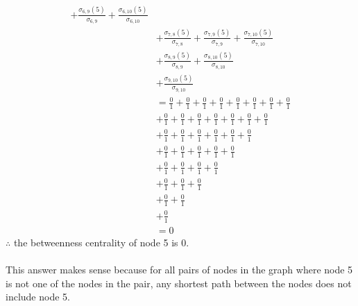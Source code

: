 \documentclass{article}
\begin{document}
\begin{enumerate}[label=(\alph*), left=10pt, itemsep=10pt]
\begin{minipage}[t]{0.9\textwidth}
\begin{align*}
                               + \frac{\sigma_{6,9}(5)}{\sigma_{6,9}}
                               + \frac{\sigma_{6,10}(5)}{\sigma_{6,10}}\\
                            &+   \frac{\sigma_{7,8}(5)}{\sigma_{7,8}}
                               + \frac{\sigma_{7,9}(5)}{\sigma_{7,9}}
                               + \frac{\sigma_{7,10}(5)}{\sigma_{7,10}}\\
                            &+   \frac{\sigma_{8,9}(5)}{\sigma_{8,9}}
                               + \frac{\sigma_{8,10}(5)}{\sigma_{8,10}}\\
                            &+   \frac{\sigma_{9,10}(5)}{\sigma_{9,10}}\\
                            &=   \frac{0}{1}
                               + \frac{0}{1}
                               + \frac{0}{1}
                               + \frac{0}{1}
                               + \frac{0}{1}
                               + \frac{0}{1}
                               + \frac{0}{1}
                               + \frac{0}{1}\\
                            &  + \frac{0}{1}
                               + \frac{0}{1}
                               + \frac{0}{1}
                               + \frac{0}{1}
                               + \frac{0}{1}
                               + \frac{0}{1}
                               + \frac{0}{1}\\
                            &  + \frac{0}{1}
                               + \frac{0}{1}
                               + \frac{0}{1}
                               + \frac{0}{1}
                               + \frac{0}{1}
                               + \frac{0}{1}\\
                            &  + \frac{0}{1}
                               + \frac{0}{1}
                               + \frac{0}{1}
                               + \frac{0}{1}
                               + \frac{0}{1}\\
                            &  + \frac{0}{1}
                               + \frac{0}{1}
                               + \frac{0}{1}
                               + \frac{0}{1}\\
                            &  + \frac{0}{1}
                               + \frac{0}{1}
                               + \frac{0}{1}\\
                            &  + \frac{0}{1}
                               + \frac{0}{1}\\
                            &  + \frac{0}{1}\\
                            &=0
                \end{align*}
                $\therefore$ the betweenness centrality of node 5 is $0$.\\\\
                This answer makes sense because for all pairs of nodes in the graph where node 5 is not
                one of the nodes in the pair, any shortest path between the nodes does not include node 5.


\end{minipage}
\end{enumerate}
\end{document}
